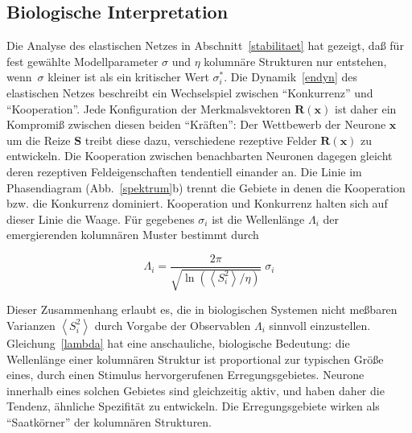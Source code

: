 \subsection{Biologische Interpretation}
\label{biointerpret}

Die Analyse des elastischen Netzes in Abschnitt~\ref{stabilitaet} hat
gezeigt, daß für fest gewählte Modellparameter $\sigma$ und $\eta$
kolumnäre Strukturen nur entstehen, wenn~$\sigma$ kleiner ist als ein
kritischer Wert $\sigma_i^\ast$. Die Dynamik~\eqref{endyn} des elastischen
Netzes beschreibt ein Wechselspiel zwischen ``Konkurrenz'' und
``Kooperation''. Jede Konfiguration der Merkmalsvektoren $\mathbf{R(x)}$
ist daher ein Kompromiß zwischen diesen beiden ``Kräften'': Der
Wettbewerb der Neurone $\mathbf{x}$ um die Reize $\mathbf{S}$ treibt diese
dazu, verschiedene rezeptive Felder $\mathbf{R(x)}$ zu entwickeln. Die
Kooperation zwischen benachbarten Neuronen dagegen gleicht deren rezeptiven
Feldeigenschaften tendentiell einander an. Die Linie im Phasendiagram
(Abb.~\ref{spektrum}b) trennt die Gebiete in denen die Kooperation
bzw. die Konkurrenz dominiert. Kooperation und Konkurrenz halten sich auf
dieser Linie die Waage. Für gegebenes $\sigma_i$ ist die Wellenlänge
$\Lambda_i$ der emergierenden kolumnären Muster bestimmt durch

\begin{equation}
    \Lambda_i = \frac{2 \pi}{\sqrt{\ln\left(\left<S_i^2\right>/\eta\right)}}\;\sigma_i
    \label{lambda}
\end{equation}

Dieser Zusammenhang erlaubt es, die in biologischen Systemen nicht
meßbaren Varianzen $\left<S_i^2\right>$ durch Vorgabe der Observablen
$\Lambda_i$ sinnvoll einzustellen. Gleichung~\eqref{lambda} hat eine
anschauliche, biologische Bedeutung: die Wellenlänge einer kolumnären
Struktur ist proportional zur typischen Größe eines, durch einen Stimulus
hervorgerufenen Erregungsgebietes. Neurone innerhalb eines solchen Gebietes
sind gleichzeitig aktiv, und haben daher die Tendenz, ähnliche Spezifität
zu entwickeln. Die Erregungsgebiete wirken als ``Saatkörner'' der
kolumnären Strukturen.
